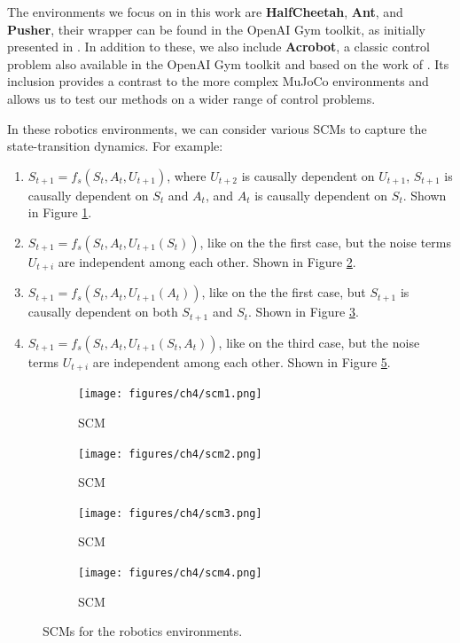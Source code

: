 The environments we focus on in this work are
\textbf{HalfCheetah}, \textbf{Ant}, and \textbf{Pusher},
their wrapper can be found
in the OpenAI Gym toolkit, as initially
presented in \cite{brockman2016openaigym}.
In addition to these, we also include \textbf{Acrobot},
a classic control problem also available in the OpenAI Gym
toolkit and based on the work of \cite{sutton1998}.
Its inclusion provides
a contrast to the more complex MuJoCo environments and
allows us to test our methods on a wider range of
control problems.

In these robotics environments, we can consider
various SCMs
to capture the state-transition dynamics. For example:
\begin{enumerate}
    \item $S_{t+1} = f_s(S_t, A_t, U_{t+1})$, where $U_{t+2}$
    is causally dependent on $U_{t+1}$, 
    $S_{t+1}$ is causally dependent on $S_t$ and $A_t$, and
    $A_t$ is causally dependent on $S_t$. Shown in Figure \ref{fig:scm1}.
    \item $S_{t+1} = f_s(S_t, A_t, U_{t+1}(S_t))$, like on the
    the first case, but the noise terms $U_{t+i}$ are independent
    among each other. Shown in Figure \ref{fig:scm2}.
    \item $S_{t+1} = f_s(S_t, A_t, U_{t+1}(A_t))$, like on the
    the first case, but $S_{t+1}$ is causally dependent on both $S_{t+1}$
    and $S_t$. Shown in Figure \ref{fig:scm3}.
    \item $S_{t+1} = f_s(S_t, A_t, U_{t+1}(S_t, A_t))$, like on the
    third case, but the noise terms $U_{t+i}$ are independent
    among each other. Shown in Figure \ref{fig:scm4}.
\end{enumerate}
\begin{figure}
    \begin{subfigure}[t]{.4\textwidth}
        \centering
        \texttt{[image: figures/ch4/scm1.png]}
        \caption{ SCM}
        \label{fig:scm1}
    \end{subfigure}
    \hfill
    \begin{subfigure}[t]{.4\textwidth}
        \centering
        \texttt{[image: figures/ch4/scm2.png]}
        \caption{ SCM}
        \label{fig:scm2}
    \end{subfigure}
    \medskip
    \begin{subfigure}[t]{.4\textwidth}
        \centering
        \texttt{[image: figures/ch4/scm3.png]}
        \caption{ SCM}
        \label{fig:scm3}
    \end{subfigure}
    \hfill
    \begin{subfigure}[t]{.4\textwidth}
        \centering
        \texttt{[image: figures/ch4/scm4.png]}
        \caption{ SCM}
        \label{fig:scm4}
    \end{subfigure}
    \caption{SCMs for the robotics environments.}
\end{figure}
